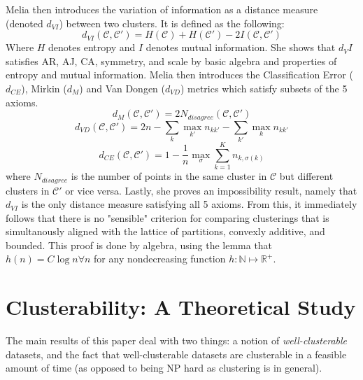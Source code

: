     Melia then introduces the variation of information as a distance measure (denoted $d_{VI}$) between two clusters. It is defined as the following:
    $$d_{VI}(\mathcal{C},\mathcal{C}') = H(\mathcal{C})+H(\mathcal{C}') - 2I(\mathcal{C},\mathcal{C}')$$
    Where $H$ denotes entropy and $I$ denotes mutual information. She shows that $d_VI$ satisfies AR, AJ, CA, symmetry, and scale by basic algebra and properties of entropy and mutual information.
    Melia then introduces the Classification Error ($d_{CE}$), Mirkin ($d_M$) and Van Dongen ($d_{VD}$) metrics which satisfy subsets of the 5 axioms.
    $$d_M(\mathcal{C},\mathcal{C}') = 2N_{disagree}(\mathcal{C},\mathcal{C}')$$
    $$d_{VD}(\mathcal{C},\mathcal{C}') = 2n-\sum_k \max_{k'} n_{k k'} - \sum_{k'} \max_{k} n_{k k'}$$
    $$d_{CE}(\mathcal{C},\mathcal{C}') = 1-\frac{1}{n}\max_{\sigma}\sum_{k=1}^K n_{k,\sigma(k)}$$
    where $N_{disagree}$ is the number of points in the same cluster in $\mathcal{C}$ but different clusters in $\mathcal{C}'$ or vice versa.
    Lastly, she proves an impossibility result, namely that $d_{VI}$ is the only distance measure satisfying all 5 axioms. From this, it immediately follows that there is no "sensible" criterion for comparing clusterings that is simultanously aligned with the lattice of partitions, convexly additive, and bounded. This proof is done by algebra, using the lemma that $h(n) = C\log n \forall n$ for any nondecreasing function $h: \mathbb{N} \mapsto \mathbb{R}^+$.


\section{Clusterability: A Theoretical Study}
    
    The main results of this paper deal with two things: a notion of \textit{well-clusterable} datasets, and the fact that well-clusterable datasets are clusterable in a feasible amount of time (as opposed to being NP hard as clustering is in general).\\
    
